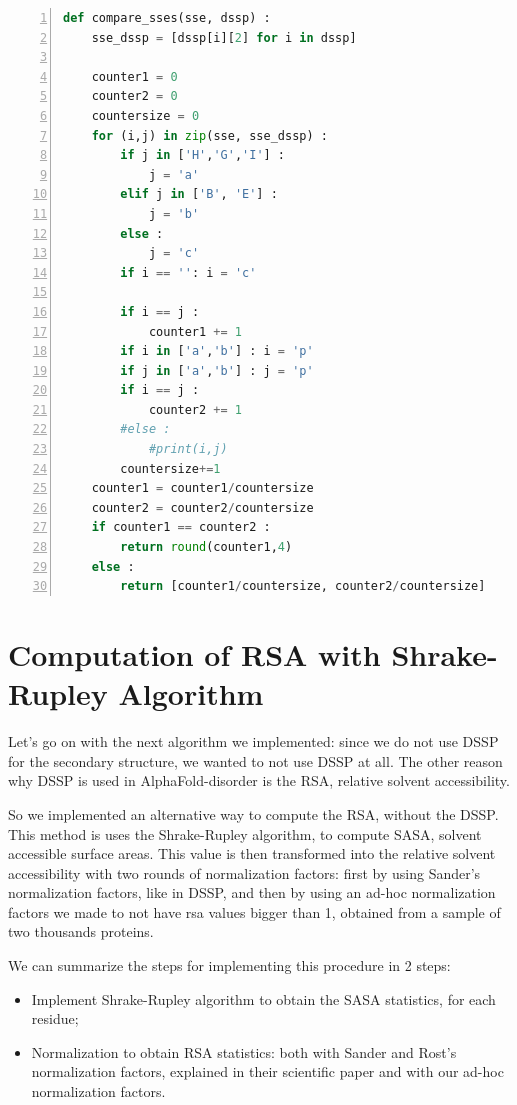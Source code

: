 \begin{lstlisting}[language=Python, caption=Procedure to compare SSEs, numbers=left]
def compare_sses(sse, dssp) :
    sse_dssp = [dssp[i][2] for i in dssp]
         
    counter1 = 0
    counter2 = 0
    countersize = 0
    for (i,j) in zip(sse, sse_dssp) :
        if j in ['H','G','I'] : 
            j = 'a'
        elif j in ['B', 'E'] : 
            j = 'b'
        else : 
            j = 'c'
        if i == '': i = 'c'
 
        if i == j :
            counter1 += 1
        if i in ['a','b'] : i = 'p'
        if j in ['a','b'] : j = 'p'
        if i == j :
            counter2 += 1
        #else :
            #print(i,j)
        countersize+=1
    counter1 = counter1/countersize
    counter2 = counter2/countersize
    if counter1 == counter2 :
        return round(counter1,4)
    else :
        return [counter1/countersize, counter2/countersize]

\end{lstlisting}
\pagebreak

\section{Computation of RSA with Shrake-Rupley Algorithm}
Let's go on with the next algorithm we implemented: since we do not use DSSP for the secondary structure, we wanted to not use DSSP at all. The other reason why DSSP is used in AlphaFold-disorder is the RSA, relative solvent accessibility.

So we implemented an alternative way to compute the RSA, without the DSSP. This method is uses the Shrake-Rupley algorithm, to compute SASA, solvent accessible surface areas. This value is then transformed into the relative solvent accessibility with two rounds of normalization factors: first by using Sander's normalization factors, like in DSSP, and then by using an ad-hoc normalization factors we made to not have rsa values bigger than 1, obtained from a sample of two thousands proteins.

We can summarize the steps for implementing this procedure in 2 steps:
\begin{itemize}
    \item Implement Shrake-Rupley algorithm to obtain the SASA statistics, for each residue;
    \item Normalization to obtain RSA statistics: both with Sander and Rost's normalization factors, explained in their scientific paper \cite{Sander-Rost} and with our ad-hoc normalization factors.
\end{itemize}


